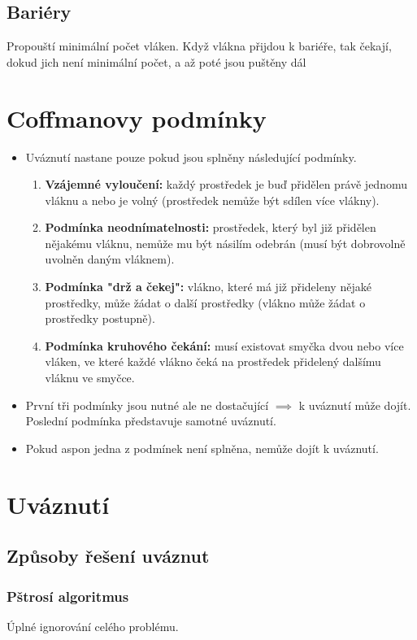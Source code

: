 \documentclass{szzclass}
\begin{document}
\subsection{Bariéry}
Propouští minimální počet vláken. Když vlákna přijdou k bariéře, tak čekají, dokud jich není minimální počet, a až poté jsou puštěny dál



\section{Coffmanovy podmínky}
\begin{itemize}
    \item Uváznutí nastane pouze pokud jsou splněny následující podmínky.
\begin{enumerate}
    \item \textbf{Vzájemné vyloučení:}
    každý prostředek je buď přidělen právě jednomu vláknu
    a nebo je volný (prostředek nemůže být sdílen více vlákny).
    \item \textbf{Podmínka neodnímatelnosti:} prostředek, který byl již
    přidělen nějakému vláknu, nemůže mu být násilím odebrán
    (musí být dobrovolně uvolněn daným vláknem).
    \item \textbf{Podmínka "drž a čekej":} vlákno, které má již přideleny
    nějaké prostředky, může žádat o další prostředky
    (vlákno může žádat o prostředky postupně).
    \item \textbf{Podmínka kruhového čekání:} musí existovat smyčka
    dvou nebo více vláken, ve které každé vlákno čeká na prostředek
    přidelený dalšímu vláknu ve smyčce.
\end{enumerate}
\item První tři podmínky jsou nutné ale ne dostačující $\implies$ k
uváznutí může dojít. Poslední podmínka představuje samotné uváznutí.
\item Pokud aspon jedna z podmínek není splněna, nemůže dojít k uváznutí.
\end{itemize}
\section{Uváznutí}
\subsection{Způsoby řešení uváznut}

\subsubsection{Pštrosí algoritmus}
Úplné ignorování celého problému. 
\end{document}
